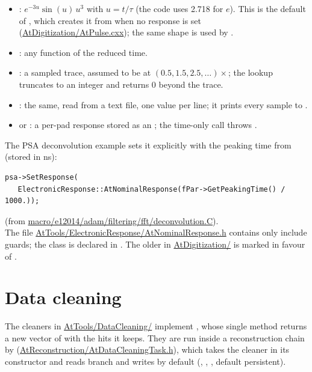 \begin{itemize}
\item {}: $e^{-3u}\sin(u)\,u^3$ with $u = t/\tau$ (the code uses 2.718 for $e$).
  This is the default of , which creates it from  when no response is set
  (\url{AtDigitization/AtPulse.cxx}); the same shape is used by .
\item {}: any function of the reduced time.
\item {}: a sampled trace, assumed to be at
  $(0.5, 1.5, 2.5, \ldots)\times$; the lookup truncates  to an integer and returns 0
  beyond the trace.
\item {}: the same, read from a text file, one value per line; it prints every sample
  to .
\item {} or : a per-pad response stored as an
  ; the time-only call throws .
\end{itemize}
The PSA deconvolution example sets it explicitly with the peaking time from  (stored in ns):
\begin{verbatim}
psa->SetResponse(
   ElectronicResponse::AtNominalResponse(fPar->GetPeakingTime() / 1000.));
\end{verbatim}
\noindent
(from \url{macro/e12014/adam/filtering/fft/deconvolution.C}).\\ The file
\url{AtTools/ElectronicResponse/AtNominalResponse.h} contains only include guards; the class is declared in
. The older
 in \url{AtDigitization/} is marked \code{[[deprecated]]} in favour of
.

\section{Data cleaning}

The cleaners in \url{AtTools/DataCleaning/} implement , whose single
method  returns a new vector of  with the hits
it keeps. They are run inside a reconstruction chain by 
(\url{AtReconstruction/AtDataCleaningTask.h}), which takes the cleaner in its constructor and reads branch
 and writes  by default (, ,
, default persistent).

